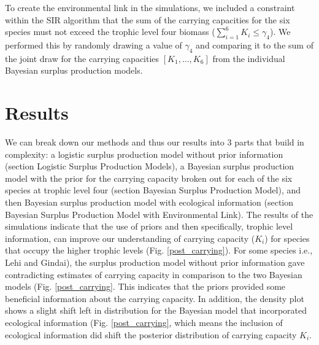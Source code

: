 \documentclass[oneside,12pt,final]{sty/ucthesis-CA2012}
\begin{document}
\begin{mainmatter}
\vspace{5mm}

To create the environmental link in the simulations, we included a constraint within the SIR algorithm that the sum of the carrying capacities for the six species must not exceed the trophic level four biomass ($\sum_{i=1}^{6} K_i \le \gamma_4$). We performed this by randomly drawing a value of $\gamma_4$ and comparing it to the sum of the joint draw for the carrying capacities $[K_1,\dots,K_6]$ from the individual Bayesian surplus production models.


\section{Results}
We can break down our methods and thus our results into 3 parts that build in complexity: a logistic surplus production model without prior information (section Logistic Surplus Production Models), a Bayesian surplus production model with the prior for the carrying capacity broken out for each of the six species at trophic level four (section Bayesian Surplus Production Model), and then Bayesian surplus production model with ecological information (section Bayesian Surplus Production Model with Environmental Link). The results of the simulations indicate that the use of priors and then specifically, trophic level information, can improve our understanding of carrying capacity ($K_i$) for species that occupy the higher trophic levels (Fig. \ref{post_carrying}). For some species i.e., Lehi and Gindai), the surplus production model without prior information gave contradicting estimates of carrying capacity in comparison to  the two Bayesian models (Fig. \ref{post_carrying}. This indicates that the priors provided some beneficial information about the carrying capacity. In addition, the density plot shows a slight shift left in distribution for the Bayesian model that incorporated ecological information (Fig. \ref{post_carrying}, which means the inclusion of ecological information did shift the posterior distribution of carrying capacity $K_i$.


\end{mainmatter}
\end{document}
